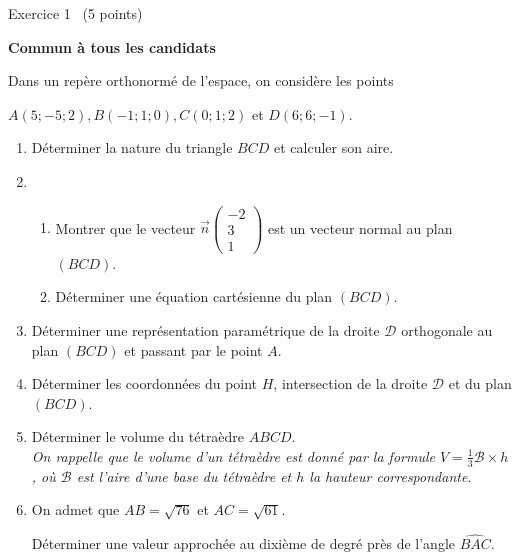
%
\begin{h2}Exercice 1  (5 points)\end{h2}
\textbf{Commun  à tous les candidats}
\par
Dans un repère orthonormé de l'espace, on considère les points
\par
$A \left(5 ; -5 ; 2\right), B \left(-1 ; 1 ; 0\right), C \left(0 ; 1 ; 2\right) $ et $ D \left(6 ; 6 ; -1\right).$
\begin{enumerate}
     \item
     Déterminer la nature du triangle $BCD$ et calculer son aire.
     \item
     \begin{enumerate}[label=\alph*.]
          \item
          Montrer que le vecteur $\vec{n} \begin{pmatrix} -2 \\   3 \\   1\end{pmatrix}$  est un vecteur normal au plan $\left(BCD\right)$.
          \item
     Déterminer une équation cartésienne du plan $\left(BCD\right)$.\end{enumerate}
     \item
     Déterminer une représentation paramétrique de la droite $\mathscr D$ orthogonale au plan $\left(BCD\right)$ et passant par le point $A$.
     \item
     Déterminer les coordonnées du point $H$, intersection de la droite $\mathscr D$ et du plan $\left(BCD\right)$.
     \item
     Déterminer le volume du tétraèdre $ABCD$.
\\
     \textit{On rappelle que le volume d'un tétraèdre est donné par la formule  $V=\frac{1}{3} \mathscr B\times h$, où $\mathscr B$ est
     l'aire d'une base du tétraèdre et $h$ la hauteur correspondante.}
     \item
     On admet que $AB=\sqrt{76}$ et $AC= \sqrt{61}$.
     \par
Déterminer une valeur approchée au dixième de degré près de l'angle $\widehat{BAC}$.\end{enumerate}
